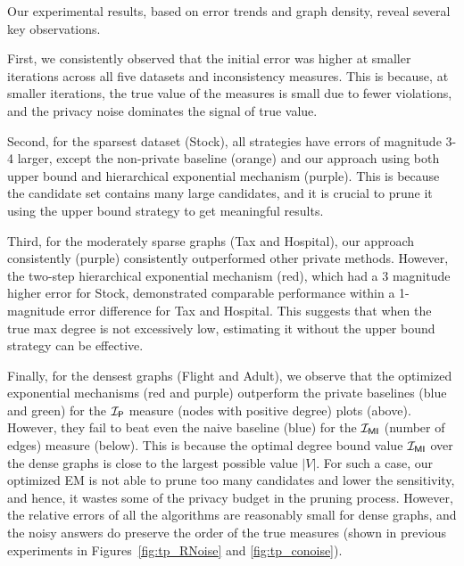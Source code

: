 Our experimental results, based on error trends and graph density, reveal several key observations.

First, we consistently observed that the initial error was higher at smaller iterations across all five datasets and inconsistency measures. This is because, at smaller iterations, the true value of the measures is small due to fewer violations, and the privacy noise dominates the signal of true value.

Second, for the sparsest dataset (Stock), all strategies have errors of magnitude 3-4 larger, except the non-private baseline (orange) and our approach using both upper bound and hierarchical exponential mechanism (purple). This is because the candidate set contains many large candidates, and it is crucial to prune it using the upper bound strategy to get meaningful results. 

Third, for the moderately sparse graphs (Tax and Hospital), our approach consistently (purple) consistently outperformed other private methods.  However, the two-step hierarchical exponential mechanism (red), which had a $3$ magnitude higher error for Stock, demonstrated comparable performance within a 1-magnitude error difference for Tax and Hospital.  This suggests that when the true max degree is not excessively low, estimating it without the upper bound strategy can be effective.

Finally, for the densest graphs (Flight and Adult), we observe that the optimized exponential mechanisms (red and purple) outperform the private baselines (blue and green) for the $\mathcal{I_\mathsf{P}}$ measure (nodes with positive degree) plots (above). However, they fail to beat even the naive baseline (blue) for the $\mathcal{I_{\mathsf{MI}}}$ (number of edges) measure (below). This is because the optimal degree bound value $\mathcal{I_{\mathsf{MI}}}$ over the dense graphs is close to the largest possible value $|V|$. For such a case, our optimized EM is not able to prune too many candidates and lower the sensitivity, and hence, it wastes some of the privacy budget in the pruning process. However, the relative errors of all the algorithms are reasonably small for dense graphs, and the noisy answers do preserve the order of the true measures (shown in previous experiments in Figures~\ref{fig:tp_RNoise} and \ref{fig:tp_conoise}). 


